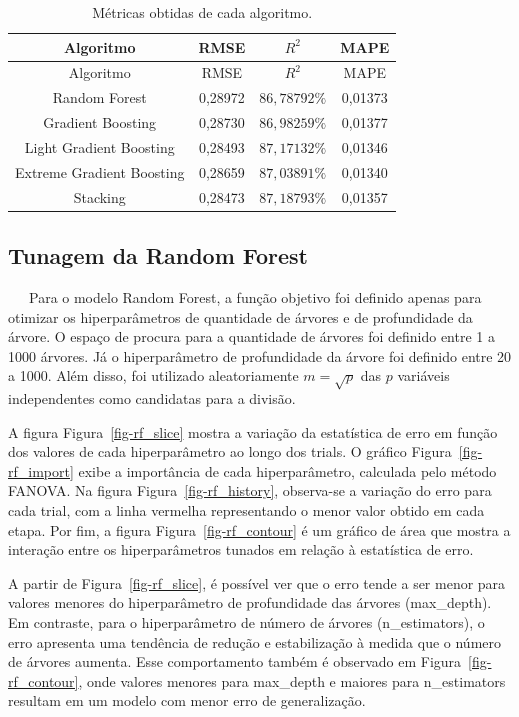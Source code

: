 \documentclass[
  12pt,
  a4paper,
]{scrreprt}
\begin{document}
\begin{longtable}[]{@{}cccc@{}}
\caption{Métricas obtidas de cada
algoritmo.}\label{tbl-metrics_models}\tabularnewline
\toprule\noalign{}
Algoritmo & RMSE & \(R^2\) & MAPE \\
\midrule\noalign{}
\endfirsthead
\toprule\noalign{}
Algoritmo & RMSE & \(R^2\) & MAPE \\
\midrule\noalign{}
\endhead
\bottomrule\noalign{}
\endlastfoot
Random Forest & 0,28972 & \(86,78792\%\) & 0,01373 \\
Gradient Boosting & 0,28730 & \(86,98259\%\) & 0,01377 \\
Light Gradient Boosting & 0,28493 & \(87,17132\%\) & 0,01346 \\
Extreme Gradient Boosting & 0,28659 & \(87,03891\%\) & 0,01340 \\
Stacking & 0,28473 & \(87,18793\%\) & 0,01357 \\
\end{longtable}

\subsection{Tunagem da Random Forest}\label{tunagem-da-random-forest}

~~~Para o modelo Random Forest, a função objetivo foi definido apenas
para otimizar os hiperparâmetros de quantidade de árvores e de
profundidade da árvore. O espaço de procura para a quantidade de árvores
foi definido entre 1 a 1000 árvores. Já o hiperparâmetro de profundidade
da árvore foi definido entre 20 a 1000. Além disso, foi utilizado
aleatoriamente \(m = \sqrt{p}\) das \(p\) variáveis independentes como
candidatas para a divisão.

\vspace{12pt}

A figura Figura~\ref{fig-rf_slice} mostra a variação da estatística de
erro em função dos valores de cada hiperparâmetro ao longo dos trials. O
gráfico Figura~\ref{fig-rf_import} exibe a importância de cada
hiperparâmetro, calculada pelo método FANOVA. Na figura
Figura~\ref{fig-rf_history}, observa-se a variação do erro para cada
trial, com a linha vermelha representando o menor valor obtido em cada
etapa. Por fim, a figura Figura~\ref{fig-rf_contour} é um gráfico de
área que mostra a interação entre os hiperparâmetros tunados em relação
à estatística de erro.

\vspace{12pt}

A partir de Figura~\ref{fig-rf_slice}, é possível ver que o erro tende a
ser menor para valores menores do hiperparâmetro de profundidade das
árvores (max\_depth). Em contraste, para o hiperparâmetro de número de
árvores (n\_estimators), o erro apresenta uma tendência de redução e
estabilização à medida que o número de árvores aumenta. Esse
comportamento também é observado em Figura~\ref{fig-rf_contour}, onde
valores menores para max\_depth e maiores para n\_estimators resultam em
um modelo com menor erro de generalização.
\end{document}
